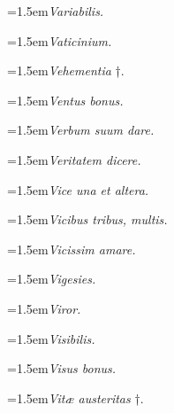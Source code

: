 \par{\dictfontsize\hangindent=1.5em\noindent \textit{Variabilis.} \par}
\par{\dictfontsize\hangindent=1.5em\noindent \textit{Vaticinium.} \par}
\par{\dictfontsize\hangindent=1.5em\noindent \textit{Vehementia} †. \par}
\par{\dictfontsize\hangindent=1.5em\noindent \textit{Ventus bonus.} \par}
\par{\dictfontsize\hangindent=1.5em\noindent \textit{Verbum suum dare.} \par}
\par{\dictfontsize\hangindent=1.5em\noindent \textit{Veritatem dicere.} \par}
\par{\dictfontsize\hangindent=1.5em\noindent \textit{Vice una et altera.} \par}
\par{\dictfontsize\hangindent=1.5em\noindent \textit{Vicibus tribus, multis.} \par}
\par{\dictfontsize\hangindent=1.5em\noindent \textit{Vicissim amare.} \par}
\par{\dictfontsize\hangindent=1.5em\noindent \textit{Vigesies.} \par}
\par{\dictfontsize\hangindent=1.5em\noindent \textit{Viror.} \par}
\par{\dictfontsize\hangindent=1.5em\noindent \textit{Visibilis.} \par}
\par{\dictfontsize\hangindent=1.5em\noindent \textit{Visus bonus.} \par}
\par{\dictfontsize\hangindent=1.5em\noindent \textit{Vitæ austeritas} †. \par}
